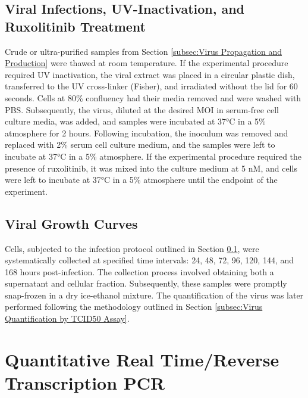 \subsection{Viral Infections, UV-Inactivation, and Ruxolitinib Treatment} \label{subsec:Viral Infections, UV-Inactivation and Ruxolitinib Treatment}
Crude or ultra-purified samples from Section \ref{subsec:Virus Propagation and Production} were thawed at room temperature. If the experimental procedure required UV inactivation, the viral extract was placed in a circular plastic dish, transferred to the UV cross-linker (Fisher), and irradiated without the lid for 60 seconds. Cells at 80\% confluency had their media removed and were washed with PBS. Subsequently, the virus, diluted at the desired MOI in serum-free cell culture media, was added, and samples were incubated at 37°C in a 5\%  atmosphere for 2 hours. Following incubation, the inoculum was removed and replaced with 2\% serum cell culture medium, and the samples were left to incubate at 37°C in a 5\%  atmosphere. If the experimental procedure required the presence of ruxolitinib, it was mixed into the culture medium at 5 nM, and cells were left to incubate at 37°C in a 5\%  atmosphere until the endpoint of the experiment.

\subsection{Viral Growth Curves} \label{subsec:Viral Growth Curves}
Cells, subjected to the infection protocol outlined in Section \ref{subsec:Viral Infections, UV-Inactivation and Ruxolitinib Treatment}, were systematically collected at specified time intervals: 24, 48, 72, 96, 120, 144, and 168 hours post-infection. The collection process involved obtaining both a supernatant and cellular fraction. Subsequently, these samples were promptly snap-frozen in a dry ice-ethanol mixture. The quantification of the virus was later performed following the methodology outlined in Section \ref{subsec:Virus Quantification by TCID50 Assay}.


\section{Quantitative Real Time/Reverse Transcription PCR} \label{sec:Quantitative Real Time/Reverse Transcription PCR}
